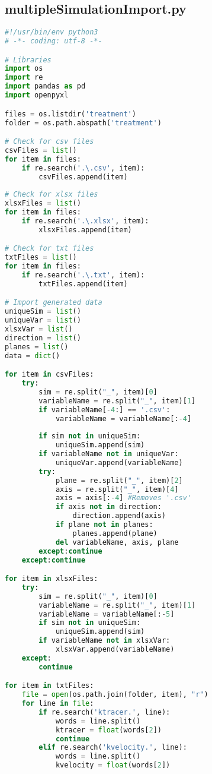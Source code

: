 \subsection{multipleSimulationImport.py}
\begin{lstlisting}[language=python]
#!/usr/bin/env python3
# -*- coding: utf-8 -*-

# Libraries
import os
import re
import pandas as pd
import openpyxl

files = os.listdir('treatment')
folder = os.path.abspath('treatment')

# Check for csv files
csvFiles = list()
for item in files:
    if re.search('.\.csv', item):
        csvFiles.append(item)
        
# Check for xlsx files
xlsxFiles = list()
for item in files:
    if re.search('.\.xlsx', item):
        xlsxFiles.append(item)

# Check for txt files
txtFiles = list()
for item in files:
    if re.search('.\.txt', item):
        txtFiles.append(item)

# Import generated data
uniqueSim = list()
uniqueVar = list()
xlsxVar = list()
direction = list()
planes = list()
data = dict()

for item in csvFiles:
    try:
        sim = re.split("_", item)[0]
        variableName = re.split("_", item)[1]
        if variableName[-4:] == '.csv':
            variableName = variableName[:-4]
        
        if sim not in uniqueSim:
            uniqueSim.append(sim)
        if variableName not in uniqueVar:
            uniqueVar.append(variableName)
        try:
            plane = re.split("_", item)[2]
            axis = re.split("_", item)[4]
            axis = axis[:-4] #Removes '.csv'
            if axis not in direction:
                direction.append(axis)
            if plane not in planes:
                planes.append(plane)
            del variableName, axis, plane
        except:continue
    except:continue

for item in xlsxFiles:
    try:
        sim = re.split("_", item)[0]
        variableName = re.split("_", item)[1]
        variableName = variableName[:-5]
        if sim not in uniqueSim:
            uniqueSim.append(sim)
        if variableName not in xlsxVar:
            xlsxVar.append(variableName)
    except:
        continue

for item in txtFiles:
    file = open(os.path.join(folder, item), "r")
    for line in file:
        if re.search('ktracer.', line):
            words = line.split()
            ktracer = float(words[2])
            continue
        elif re.search('kvelocity.', line):
            words = line.split()
            kvelocity = float(words[2])


\end{lstlisting}
